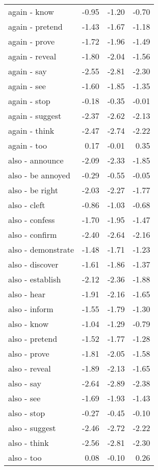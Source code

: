 \begin{longtable}{lrrr}
  again - know & -0.95 & -1.20 & -0.70 \\ 
  again - pretend & -1.43 & -1.67 & -1.18 \\ 
  again - prove & -1.72 & -1.96 & -1.49 \\ 
  again - reveal & -1.80 & -2.04 & -1.56 \\ 
  again - say & -2.55 & -2.81 & -2.30 \\ 
  again - see & -1.60 & -1.85 & -1.35 \\ 
  again - stop & -0.18 & -0.35 & -0.01 \\ 
  again - suggest & -2.37 & -2.62 & -2.13 \\ 
  again - think & -2.47 & -2.74 & -2.22 \\ 
  again - too & 0.17 & -0.01 & 0.35 \\ 
  also - announce & -2.09 & -2.33 & -1.85 \\ 
  also - be annoyed & -0.29 & -0.55 & -0.05 \\ 
  also - be right & -2.03 & -2.27 & -1.77 \\ 
  also - cleft & -0.86 & -1.03 & -0.68 \\ 
  also - confess & -1.70 & -1.95 & -1.47 \\ 
  also - confirm & -2.40 & -2.64 & -2.16 \\ 
  also - demonstrate & -1.48 & -1.71 & -1.23 \\ 
  also - discover & -1.61 & -1.86 & -1.37 \\ 
  also - establish & -2.12 & -2.36 & -1.88 \\ 
  also - hear & -1.91 & -2.16 & -1.65 \\ 
  also - inform & -1.55 & -1.79 & -1.30 \\ 
  also - know & -1.04 & -1.29 & -0.79 \\ 
  also - pretend & -1.52 & -1.77 & -1.28 \\ 
  also - prove & -1.81 & -2.05 & -1.58 \\ 
  also - reveal & -1.89 & -2.13 & -1.65 \\ 
  also - say & -2.64 & -2.89 & -2.38 \\ 
  also - see & -1.69 & -1.93 & -1.43 \\ 
  also - stop & -0.27 & -0.45 & -0.10 \\ 
  also - suggest & -2.46 & -2.72 & -2.22 \\ 
  also - think & -2.56 & -2.81 & -2.30 \\ 
  also - too & 0.08 & -0.10 & 0.26 \\ 

\end{longtable}
